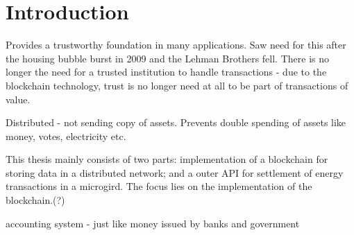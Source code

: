 \chapter{Introduction}




Provides a trustworthy foundation in many applications. Saw need for this after the housing bubble burst in 2009 and the Lehman Brothers fell. There is no longer the need for a trusted institution to handle transactions - due to the blockchain technology, trust is no longer need at all to be part of transactions of value.

Distributed - not sending copy of assets. Prevents double spending of assets like money, votes, electricity etc. 

This thesis mainly consists of two parts: implementation of a blockchain for storing data in a distributed network; and a outer API for settlement of energy transactions in a microgird. The focus lies on the implementation of the blockchain.(?)

accounting system - just like money issued by banks and government 